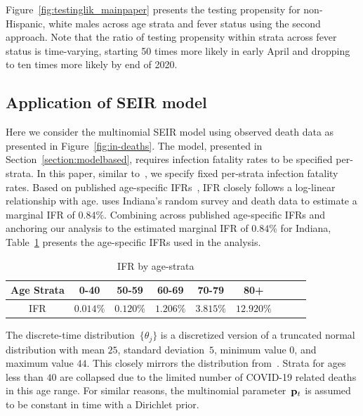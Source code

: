 \documentclass[11pt]{amsart}
\numberwithin{equation}{section}
\theoremstyle{plain}
\begin{document}
 Figure~\ref{fig:testinglik_mainpaper} presents the testing propensity for non-Hispanic, white males across age strata and fever status using the second approach.  Note that the ratio of testing propensity within strata across fever status is time-varying, starting 50 times more likely in early April and dropping to ten times more likely by end of 2020.



 \subsection{Application of SEIR model}
 \label{section:application_of_modelbased}

 Here we consider the multinomial SEIR model using observed death data as presented in Figure~\ref{fig:in-deaths}. The model, presented in Section~\ref{section:modelbased}, requires infection fatality rates to be specified per-strata.  In this paper, similar to~\cite{Johndrow2020}, we specify fixed per-strata infection fatality rates.  Based on published age-specific IFRs~\citep{Levin2020}, IFR closely follows a log-linear relationship with age. \cite{Ironse2103272118} uses Indiana's random survey and death data to estimate a marginal IFR of $0.84\%$.  Combining across published age-specific IFRs and anchoring our analysis to the estimated marginal IFR of $0.84\%$ for Indiana, Table~\ref{tab:ifrperage} presents the age-specific IFRs used in the analysis. \begin{table}[!th]
 \begin{tabular}{c | c c c c c c c c}
 Age Strata & 0-40 & 50-59 & 60-69 & 70-79 & 80+ \\ \hline
 IFR & $0.014\%$ & $0.120\%$ & $1.206\%$ & $3.815\%$ & $12.920\%$
 \end{tabular}
 \caption{IFR by age-strata}
 \label{tab:ifrperage}
 \vspace{-1cm}
 \end{table}
 The discrete-time distribution~$\{ \theta_{j} \}$ is a discretized version of a truncated normal distribution with mean $25$, standard deviation~$5$, minimum value $0$, and maximum value $44$.  This closely mirrors the distribution from~\cite{Johndrow2020}. Strata for ages less than $40$ are collapsed due to the limited number of COVID-19 related deaths in this age range. For similar reasons, the multinomial parameter~${\bf p}_t$ is assumed to be constant in time with a Dirichlet prior.
\end{document}
